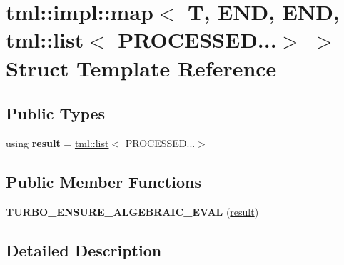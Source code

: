 \hypertarget{structtml_1_1impl_1_1map_3_01_t_00_01_e_n_d_00_01_e_n_d_00_01tml_1_1list_3_01_p_r_o_c_e_s_s_e_d_8_8_8_4_01_4}{\section{tml\+:\+:impl\+:\+:map$<$ T, E\+N\+D, E\+N\+D, tml\+:\+:list$<$ P\+R\+O\+C\+E\+S\+S\+E\+D...$>$ $>$ Struct Template Reference}
\label{structtml_1_1impl_1_1map_3_01_t_00_01_e_n_d_00_01_e_n_d_00_01tml_1_1list_3_01_p_r_o_c_e_s_s_e_d_8_8_8_4_01_4}
}
\subsection*{Public Types}
\begin{DoxyCompactItemize}
\item 
\hypertarget{structtml_1_1impl_1_1map_3_01_t_00_01_e_n_d_00_01_e_n_d_00_01tml_1_1list_3_01_p_r_o_c_e_s_s_e_d_8_8_8_4_01_4_a46679d9f0a45ffda062e1e459ec13cc8}{using {\bfseries result} = \hyperlink{structtml_1_1list}{tml\+::list}$<$ P\+R\+O\+C\+E\+S\+S\+E\+D...$>$}\label{structtml_1_1impl_1_1map_3_01_t_00_01_e_n_d_00_01_e_n_d_00_01tml_1_1list_3_01_p_r_o_c_e_s_s_e_d_8_8_8_4_01_4_a46679d9f0a45ffda062e1e459ec13cc8}

\end{DoxyCompactItemize}
\subsection*{Public Member Functions}
\begin{DoxyCompactItemize}
\item 
\hypertarget{structtml_1_1impl_1_1map_3_01_t_00_01_e_n_d_00_01_e_n_d_00_01tml_1_1list_3_01_p_r_o_c_e_s_s_e_d_8_8_8_4_01_4_affd891d9b2abdc82e6a671a1f61c5ccd}{{\bfseries T\+U\+R\+B\+O\+\_\+\+E\+N\+S\+U\+R\+E\+\_\+\+A\+L\+G\+E\+B\+R\+A\+I\+C\+\_\+\+E\+V\+A\+L} (\hyperlink{structtml_1_1list}{result})}\label{structtml_1_1impl_1_1map_3_01_t_00_01_e_n_d_00_01_e_n_d_00_01tml_1_1list_3_01_p_r_o_c_e_s_s_e_d_8_8_8_4_01_4_affd891d9b2abdc82e6a671a1f61c5ccd}

\end{DoxyCompactItemize}


\subsection{Detailed Description}
